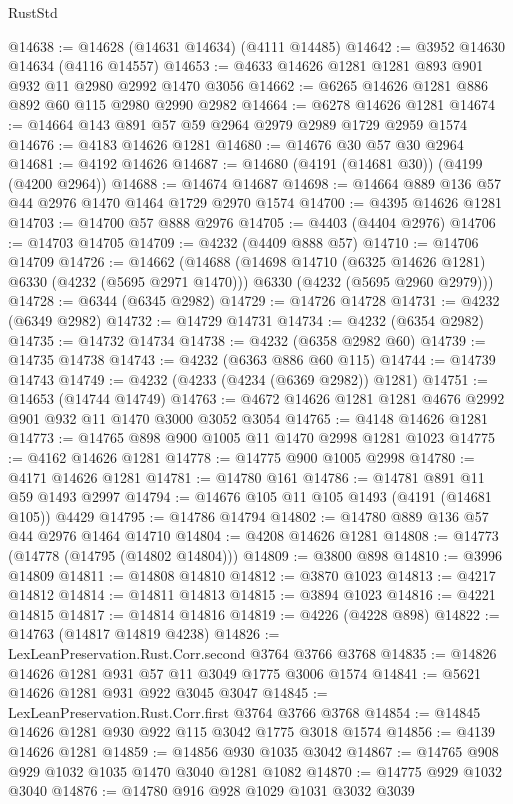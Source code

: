 \begin{lexlean}{RustStd}
\begin{coremodule}
@14638 := @14628 (@14631 @14634) (@4111 @14485)
@14642 := @3952 @14630 @14634 (@4116 @14557)
@14653 := @4633 @14626 @1281 @1281 @893 @901 @932 @11 @2980 @2992 @1470 @3056
@14662 := @6265 @14626 @1281 @886 @892 @60 @115 @2980 @2990 @2982
@14664 := @6278 @14626 @1281
@14674 := @14664 @143 @891 @57 @59 @2964 @2979 @2989 @1729 @2959 @1574
@14676 := @4183 @14626 @1281
@14680 := @14676 @30 @57 @30 @2964
@14681 := @4192 @14626
@14687 := @14680 (@4191 (@14681 @30)) (@4199 (@4200 @2964))
@14688 := @14674 @14687
@14698 := @14664 @889 @136 @57 @44 @2976 @1470 @1464 @1729 @2970 @1574
@14700 := @4395 @14626 @1281
@14703 := @14700 @57 @888 @2976
@14705 := @4403 (@4404 @2976)
@14706 := @14703 @14705
@14709 := @4232 (@4409 @888 @57)
@14710 := @14706 @14709
@14726 := @14662
    (@14688
      (@14698 @14710 (@6325 @14626 @1281) @6330 (@4232 (@5695 @2971 @1470)))
      @6330
      (@4232 (@5695 @2960 @2979)))
@14728 := @6344 (@6345 @2982)
@14729 := @14726 @14728
@14731 := @4232 (@6349 @2982)
@14732 := @14729 @14731
@14734 := @4232 (@6354 @2982)
@14735 := @14732 @14734
@14738 := @4232 (@6358 @2982 @60)
@14739 := @14735 @14738
@14743 := @4232 (@6363 @886 @60 @115)
@14744 := @14739 @14743
@14749 := @4232 (@4233 (@4234 (@6369 @2982)) @1281)
@14751 := @14653 (@14744 @14749)
@14763 := @4672 @14626 @1281 @1281 @4676 @2992 @901 @932 @11 @1470 @3000 @3052 @3054
@14765 := @4148 @14626 @1281
@14773 := @14765 @898 @900 @1005 @11 @1470 @2998 @1281 @1023
@14775 := @4162 @14626 @1281
@14778 := @14775 @900 @1005 @2998
@14780 := @4171 @14626 @1281
@14781 := @14780 @161
@14786 := @14781 @891 @11 @59 @1493 @2997
@14794 := @14676 @105 @11 @105 @1493 (@4191 (@14681 @105)) @4429
@14795 := @14786 @14794
@14802 := @14780 @889 @136 @57 @44 @2976 @1464 @14710
@14804 := @4208 @14626 @1281
@14808 := @14773 (@14778 (@14795 (@14802 @14804)))
@14809 := @3800 @898
@14810 := @3996 @14809
@14811 := @14808 @14810
@14812 := @3870 @1023
@14813 := @4217 @14812
@14814 := @14811 @14813
@14815 := @3894 @1023
@14816 := @4221 @14815
@14817 := @14814 @14816
@14819 := @4226 (@4228 @898)
@14822 := @14763 (@14817 @14819 @4238)
@14826 := LexLeanPreservation.Rust.Corr.second @3764 @3766 @3768
@14835 := @14826 @14626 @1281 @931 @57 @11 @3049 @1775 @3006 @1574
@14841 := @5621 @14626 @1281 @931 @922 @3045 @3047
@14845 := LexLeanPreservation.Rust.Corr.first @3764 @3766 @3768
@14854 := @14845 @14626 @1281 @930 @922 @115 @3042 @1775 @3018 @1574
@14856 := @4139 @14626 @1281
@14859 := @14856 @930 @1035 @3042
@14867 := @14765 @908 @929 @1032 @1035 @1470 @3040 @1281 @1082
@14870 := @14775 @929 @1032 @3040
@14876 := @14780 @916 @928 @1029 @1031 @3032 @3039

\end{coremodule}
\end{lexlean}
